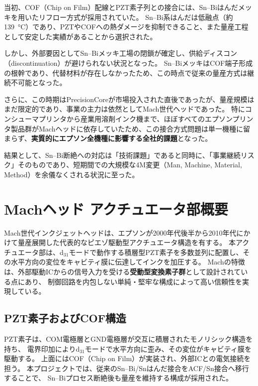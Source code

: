 \documentclass[conference]{IEEEtran}
\begin{document}
当初、COF（Chip on Film）配線とPZT素子列との接合には、Sn–Biはんだメッキを用いたリフロー方式が採用されていた。  
Sn–Bi系はんだは低融点（約\SI{139}{\degreeCelsius}）であり、PZTやCOFへの熱ダメージを抑制できること、また量産工程として安定した実績があることから選択された。  

しかし、外部要因としてSn–Biメッキ工場の閉鎖が確定し、供給ディスコン（discontinuation）が避けられない状況となった。  
Sn–BiメッキはCOF端子形成の根幹であり、代替材料が存在しなかったため、この時点で従来の量産方式は継続不可能となった。  

さらに、この時期はPrecisionCoreが市場投入された直後であったが、量産規模はまだ限定的であり、事業の主力は依然としてMach世代ヘッドであった。  
特にコンシューマプリンタから産業用溶剤インク機まで、ほぼすべてのエプソンプリンタ製品群がMachヘッドに依存していたため、この接合方式問題は単一機種に留まらず、\textbf{実質的にエプソン全機種に影響する全社的課題}となった。  

結果として、Sn–Bi断絶への対応は「技術課題」であると同時に、「事業継続リスク」そのものであり、短期間での大規模な4M変更（Man, Machine, Material, Method）を余儀なくされる状況に至った。

\section{Machヘッド アクチュエータ部概要}

Mach世代インクジェットヘッドは、エプソンが2000年代後半から2010年代にかけて量産展開した代表的なピエゾ駆動型アクチュエータ構造を有する。  
本アクチュエータ部は、d$_{31}$モードで動作する積層型PZT素子を多数並列に配置し、その水平方向の変位をキャビティ膜に伝達してインクを加圧する。  
Machの特徴は、外部駆動ICからの信号入力を受ける\textbf{受動型変換素子群}として設計されている点にあり、  
制御回路を内包しない単純・堅牢な構成によって高い信頼性を実現している。

\subsection{PZT素子およびCOF構造}
PZT素子は、COM電極層とGND電極層が交互に積層されたモノリシック構造を持ち、  
電界印加によりd$_{31}$モードで水平方向に歪み、その変位がキャビティ膜を駆動する。  
上面にはCOF（Chip on Film）が実装され、外部ICとの電気接続を担う。  
本プロジェクトでは、従来のSn–Bi/Snはんだ接合をACF/Sn接合へ移行することで、  
Sn–Biプロセス断絶後も量産を維持する構成が採用された。
\end{document}
